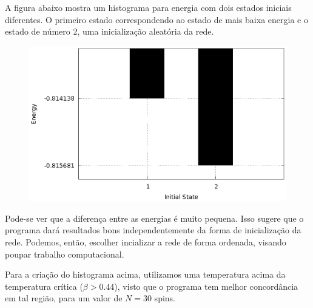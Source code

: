 




  A figura abaixo mostra um histograma para energia com dois estados iniciais diferentes. O primeiro estado correspondendo ao estado de mais baixa energia e o estado de número 2, uma inicialização aleatória da rede.

  \begin{figure}[h]
    \center
    \includegraphics{Hist.eps}
  \end{figure}

  Pode-se ver que a diferença entre as energias é muito pequena. Isso sugere que o programa dará resultados bons independentemente da forma de inicialização da rede. Podemos, então, escolher incializar a rede de forma ordenada, visando poupar trabalho computacional.

  Para a criação do histograma acima, utilizamos uma temperatura acima da temperatura crítica ($\beta > 0.44$), visto que o programa tem melhor concordância em tal região, para um valor de $N = 30$ spins. 



